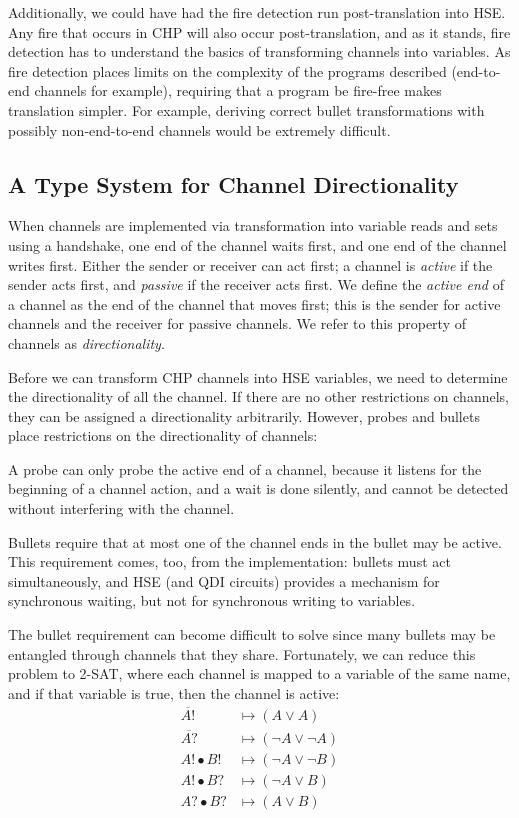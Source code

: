 \documentclass[times, 10pt]{article}
\begin{document}
Additionally, we could have had the fire detection run post-translation into
HSE.  Any fire that occurs in CHP will also occur post-translation, and as it
stands, fire detection has to understand the basics of transforming channels
into variables. As fire detection places limits on the complexity of the
programs described (end-to-end channels for example), requiring that a program
be fire-free makes translation simpler.  For example, deriving correct bullet
transformations with possibly non-end-to-end channels would be extremely
difficult.

\subsection{A Type System for Channel Directionality}

When channels are implemented via transformation into variable reads and sets
using a handshake, one end of the channel waits first, and one end of the
channel writes first.  Either the sender or receiver can act first; a channel is
\emph{active} if the sender acts first, and \emph{passive} if the receiver acts
first.  We define the \emph{active end} of a channel as the end of the channel
that moves first; this is the sender for active channels and the receiver for
passive channels. We refer to this property of channels as \emph{directionality}.

Before we can transform CHP channels into HSE variables, we need to determine
the directionality of all the channel.  If there are no other restrictions on
channels, they can be assigned a directionality arbitrarily.  However, probes
and bullets place restrictions on the directionality of channels:

A probe can only probe the active end of a channel, because it listens for the
beginning of a channel action, and a wait is done silently, and cannot be
detected without interfering with the channel.

Bullets require that at most one of the channel ends in the bullet may be
active.  This requirement comes, too, from the implementation:  bullets must act
simultaneously, and HSE (and QDI circuits) provides a mechanism for synchronous
waiting, but not for synchronous writing to variables.

The bullet requirement can become difficult to solve since many bullets may be
entangled through channels that they share.  Fortunately, we can reduce this
problem to 2-SAT, where each channel is mapped to a variable of the same name,
and if that variable is true, then the channel is active:
\begin{align*}
\overline{A!} & \mapsto (A \lor A) \\
\overline{A?} & \mapsto (\lnot A \lor \lnot A) \\
A! \bullet B! & \mapsto (\lnot A \lor \lnot B) \\
A! \bullet B? & \mapsto (\lnot A \lor B) \\
A? \bullet B? & \mapsto (A \lor B)
\end{align*}
\end{document}
